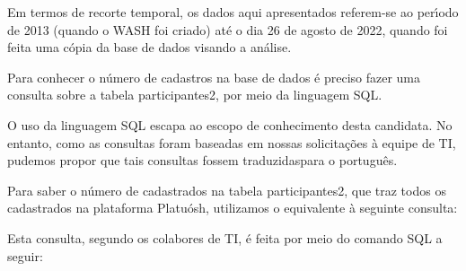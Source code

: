 \documentclass[
12pt,		%
openright,	%
twoside,  %
a4paper,			%
chapter=TITLE,		%
english,			%
french,				%
spanish,			%
brazil				%
]{USPSC-classe/USPSC_RedarTex}
\begin{document}
Em termos de recorte temporal, os dados aqui apresentados referem-se ao per\'{\i}odo de 2013 (quando o WASH foi criado) at\'e o dia 26 de agosto de 2022, quando foi feita uma c\'opia da base de dados visando a an\'alise.










Para conhecer o n\'umero de cadastros na base de dados \'e preciso fazer uma consulta sobre a tabela \textquotedbl participantes2\textquotedbl , por meio da linguagem SQL.










O uso da linguagem SQL escapa ao escopo de conhecimento desta candidata. No entanto, como as consultas foram baseadas em nossas solicita\c{c}\~oes \`a equipe de TI, pudemos propor que tais consultas fossem \textquotedbl traduzidas\textquotedbl  para o portugu\^es.










Para saber o n\'umero de cadastrados na tabela participantes2, que traz todos os cadastrados na plataforma Platu\'osh, utilizamos o equivalente \`a seguinte consulta:











\noindent\begin{center}\mbox{\centering{}}\end{center}













Esta consulta, segundo os colabores de TI, \'e feita por meio do comando SQL a seguir:
\end{document}
